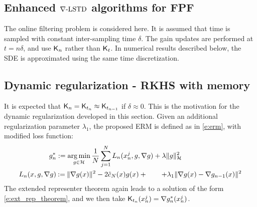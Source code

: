 \subsection{Enhanced $\nabla\text{-LSTD}$ algorithms for FPF} 

\label{s:fpf_rkhs_improvements}

The online filtering problem is considered here.
It is assumed that time is sampled with constant inter-sampling time $\delta$.     The gain updates are performed at $t = n \delta$,   and use $\text{\sf K}_n$ rather than $\text{\sf K}_t$.  In numerical results described below,  the  SDE is approximated using the same time discretization.


\subsection{Dynamic regularization - RKHS with memory}
\label{s:RKHS_memory}



It is expected that $\text{\sf K}_{n} = \text{\sf K}_{t_n}  \approx \text{\sf K}_{t_{n-1}}$ if $\delta\approx 0$.   This is the motivation for the dynamic regularization developed in this section.    Given an additional regularization parameter $\lambda_1$,  the proposed ERM is defined as in \eqref{e:erm},  with modified loss function:
\begin{equation}
\begin{aligned}
g^*_n & := \argmin_{g \in \clH} \frac{1}{N} \sum_{j=1}^N  L_n(x_n^j,g,\nabla g) + \lambda \|g\|^2_\clH
\\
L_n(x,g,\nabla g) &  \eqdef  \| \nabla g(x) \|^2 - 2 \tilc_N(x)g(x)  + \qquad + \lambda_1 \|\nabla g(x) -  \nabla g_{n-1}(x)\|^2
\end{aligned}
\label{e:erm_regularized}
\end{equation}
The extended representer theorem again leads to a solution of the form \eqref{e:ext_rep_theorem},  and we then take
$ \text{\sf K}_{t_n}(x^j_n) = \nabla g^*_n(x^j_n)$.


